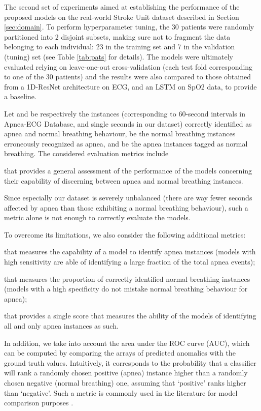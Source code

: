 \documentclass[5p,twocolumn,lefttitle]{elsarticle}
\begin{document}
The second set of experiments aimed at establishing the performance of the proposed models on the real-world Stroke Unit dataset described in Section \ref{sec:domain}. To perform hyperparameter tuning, the 30 patients were randomly partitioned into 2 disjoint subsets, making sure not to fragment the data belonging to each individual: 23 in the training set and 7 in the validation (tuning) set (see Table \ref{tab:pats} for details). The models were ultimately evaluated relying on leave-one-out cross-validation (each test fold corresponding to one of the 30 patients) and the results were also compared to those obtained from a 1D-ResNet architecture \cite{hong2019combining} on ECG, and an LSTM on SpO2 data, to provide a baseline.

Let  and  be respectively the instances (corresponding to 60-second intervals in Apnea-ECG Database, and single seconds in our dataset) correctly identified as apnea and normal breathing behaviour,  be the normal breathing instances erroneously recognized as apnea, and  be the apnea instances tagged as normal breathing. 
The considered evaluation metrics include
\smallskip

that provides a general assessment of the performance of the models concerning their capability of discerning between apnea and normal breathing instances. 

Since especially our dataset is severely unbalanced (there are way fewer seconds affected by apnea than those exhibiting a normal breathing behaviour), such a metric alone is not enough to correctly evaluate the models. 

To overcome its limitations, we also consider the following additional metrics:

that measures the capability of a model to identify apnea instances (models with high sensitivity are able of identifying a large fraction of the total apnea events);

that measures the proportion of correctly identified normal breathing instances (models with a high specificity do not mistake normal breathing behaviour for apnea);

that provides a single score that measures the ability of the models of identifying all and only apnea instances as such.

In addition, we take into account the area under the ROC curve (AUC), which can be computed by comparing  the arrays of predicted anomalies with the ground truth values. Intuitively, it corresponds to the probability that a classifier will rank a randomly chosen positive (apnea) instance higher than a randomly chosen negative (normal breathing) one, assuming that \lq positive\rq{} ranks higher than \lq negative\rq . Such a metric is commonly used in the literature for model comparison purposes \cite{fawcett2006introduction}.
\end{document}
